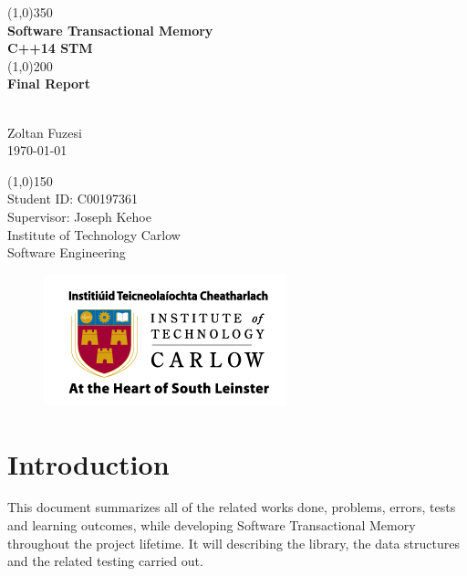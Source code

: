 \documentclass[12pt]{article}
\begin{document}
\begin{titlepage}
	\begin{center}
	\line(1,0){350}\\
	[0.3 cm]
	\huge{\textbf{Software Transactional Memory\\[0.3 cm]C++14 STM\\ }} 
	\line(1,0){200}\\
	[0.3 cm]
	\huge{\textbf{Final Report }} 
		\begin{LARGE}
		\\[0.3 cm]Zoltan Fuzesi\\
		\today
		\end{LARGE}
		
		\begin{LARGE}
		\line(1,0){150}\\
		[1.0 cm]
		Student ID: C00197361\\
		Supervisor: Joseph Kehoe\\
		\color{gray}Institute of Technology Carlow\\
		\color{gray}Software Engineering
		\end{LARGE}
		
\begin{figure}[h!]
\centering
\includegraphics[scale=0.7]{Pictures/carlow.png}

\end{figure}
		
	\end{center}
\end{titlepage}

\tableofcontents


\clearpage
{}
\setcounter{page}{1}
\section{Introduction}
This document summarizes all of the related works done, problems, errors, tests and learning outcomes, while developing Software Transactional Memory throughout the project lifetime. It will describing the library, the data structures and the related testing carried out.   
\end{document}
